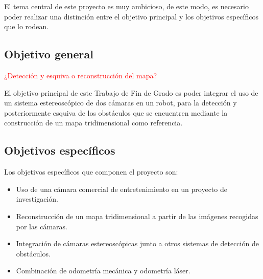 

El tema central de este proyecto es muy ambicioso, de este modo, es necesario
poder realizar una distinción entre el objetivo principal y los objetivos
específicos que lo rodean.

\subsection{Objetivo general}

\textcolor{red}{¿Detección y esquiva o reconstrucción del mapa?}

El objetivo principal de este Trabajo de Fin de Grado es poder integrar el uso
de un sistema estereoscópico de dos cámaras en un robot, para la detección y
posteriormente esquiva de los obstáculos que se encuentren mediante la
construcción de un mapa tridimensional como referencia.

\subsection{Objetivos específicos}

Los objetivos específicos que componen el proyecto son:
\begin{itemize}
  \item Uso de una cámara comercial de entretenimiento en un proyecto de
  investigación.
  \item Reconstrucción de un mapa tridimensional a partir de las imágenes
  recogidas por las cámaras.
  \item Integración de cámaras estereoscópicas junto a otros sistemas de
  detección de obstáculos.
  \item Combinación de odometría mecánica y odometría láser.
\end{itemize}

